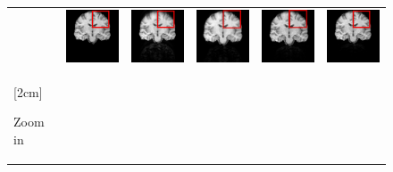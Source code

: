 \documentclass[review]{elsarticle}
\begin{document}
\begin{figure}
\begin{raggedright}
\begin{tabular}{>{\centering}b{0.2cm}lcccc}
{\begin{turn}{90}
								\end{turn}} & \includegraphics[width=2.5cm]{include/grp1/res11_org} & \includegraphics[width=2.5cm]{include/grp1/res11_zero} & \includegraphics[width=2.5cm]{include/grp1/res11_cs_red} & \includegraphics[width=2.5cm]{include/grp1/res11_L2_red} & \includegraphics[width=2.5cm]{include/grp1/res11_our}\tabularnewline
								\multirow{1}{0.2cm}[2cm]{\begin{turn}{90}
										{\footnotesize{}Zoom in}

\end{turn}}
\end{tabular}
\end{raggedright}
\end{figure}
\end{document}
